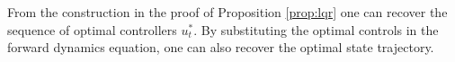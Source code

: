 From the construction in the proof of Proposition \ref{prop:lqr} one can recover the sequence of optimal controllers $u_t^*$. By substituting the optimal controls in the forward dynamics equation, one can also recover the optimal state trajectory.






